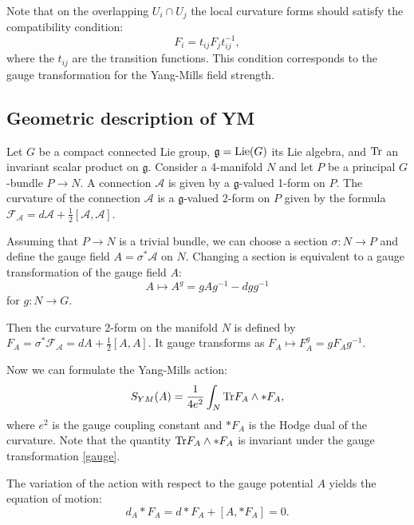 \documentclass[11pt]{report}
\theoremstyle{plain}
\theoremstyle{definition}
\theoremstyle{remark}
\theoremstyle{remark}
\numberwithin{equation}{section}
\begin{document}
Note that on the overlapping $U_i\cap U_j$ the local curvature forms should satisfy the compatibility condition:
$$F_i = t_{ij}F_jt_{ij}^{-1},$$
where the $t_{ij}$ are the transition functions. This condition corresponds to the  gauge transformation for the Yang-Mills field strength. 


\subsection{Geometric description of YM}\label{GYM}

Let $G$ be a compact connected Lie group, $\mathfrak{g}={\rm Lie}(G)$ its Lie algebra, and  ${\rm Tr}$ an invariant scalar product on $\mathfrak{g}$. Consider a 4-manifold $N$ and let $P$ be a principal $G$-bundle $P \to N$.  A connection $\mathcal{A}$ is given by a $\mathfrak{g}$-valued 1-form on $P$. The curvature of the connection $\mathcal{A}$ is a $\mathfrak{g}$-valued 2-form on $P$ given by the formula $\mathcal{F}_{\mathcal{A}} = d\mathcal{A} +\frac{1}{2}[\mathcal{A}, \mathcal{A}]$.



Assuming that $P\to N$ is a trivial bundle, we can choose a section
$\sigma: N \to P$ and define the gauge field $A= \sigma^*\mathcal{A}$ on $N$. Changing a section is equivalent to a gauge transformation of
the gauge field $A$: 
%
\begin{equation}\label{gauge}
A \mapsto A^g= gAg^{-1} - dg g^{-1}
\end{equation}
for $g: N \to G$.

Then the curvature 2-form on the manifold $N$ is defined by $F_A= \sigma^*\mathcal{F}_{\mathcal{A}} =dA + \frac{1}{2} [A,A]$. It gauge transforms as $F_A \mapsto F_A^g= gF_Ag^{-1}$.


Now we can formulate the Yang-Mills action:
\begin{equation}
S_{YM}(A)  = \frac{1}{4 e^2} \int_N {\rm Tr} F_A \wedge \ast F_A,
\end{equation}
where $e^2$ is the gauge coupling constant and $\ast F_A$ is the Hodge dual of the curvature. Note that the quantity ${\rm Tr} F_A \wedge \ast F_A$ is invariant under the gauge transformation \eqref{gauge}.

 The variation of the action with respect to the gauge potential $A$ yields the equation of motion: 
 \begin{equation}
 d_A\ast F_A = d\ast F_A + [A,\ast F_A] = 0.
 \end{equation}
 
\end{document}
